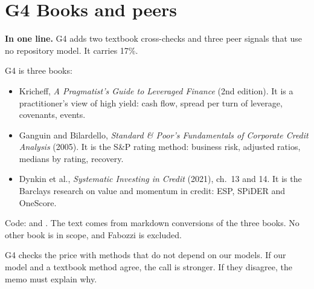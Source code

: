 \newpage
\section*{\textcolor{gD}{G4} Books and peers}

\begin{notebox}
\textbf{In one line.} G4 adds two textbook cross-checks and three peer signals that use no repository model. It carries 17\%.
\end{notebox}

G4 is three books:
\begin{itemize}
\item Kricheff, \emph{A Pragmatist's Guide to Leveraged Finance} (2nd edition). It is a practitioner's view of high yield: cash flow, spread per turn of leverage, covenants, events.
\item Ganguin and Bilardello, \emph{Standard \& Poor's Fundamentals of Corporate Credit Analysis} (2005). It is the S\&P rating method: business risk, adjusted ratios, medians by rating, recovery.
\item Dynkin et al., \emph{Systematic Investing in Credit} (2021), ch.~13 and 14. It is the Barclays research on value and momentum in credit: ESP, SPiDER and OneScore.
\end{itemize}
Code:  and . The text comes from markdown conversions of the three books. No other book is in scope, and Fabozzi is excluded.

G4 checks the price with methods that do not depend on our models. If our model and a textbook method agree, the call is stronger. If they disagree, the memo must explain why.

